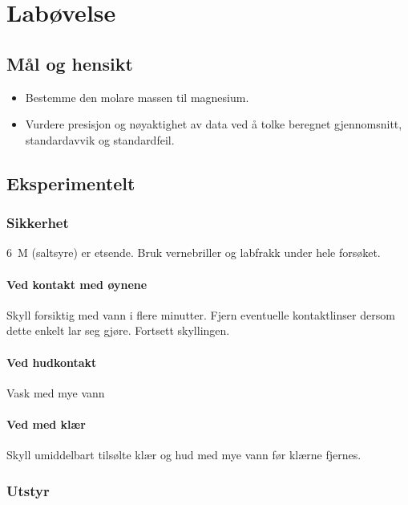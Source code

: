 	\clearpage
	
	\section{Labøvelse}
	
	\subsection{Mål og hensikt}
	\begin{itemize}
		\item Bestemme den molare massen til magnesium.
		\item Vurdere presisjon og nøyaktighet av data ved å tolke beregnet gjennomsnitt, standardavvik og standardfeil.
	\end{itemize}
	
	\subsection{Eksperimentelt}
	
	\subsubsection{Sikkerhet}
	\SI{6}{M}  (saltsyre) er etsende. Bruk vernebriller og labfrakk under hele forsøket.
	
	\paragraph{Ved kontakt med øynene}
	Skyll forsiktig med vann i flere minutter. Fjern eventuelle kontaktlinser dersom dette enkelt lar seg gjøre. Fortsett skyllingen.
	
	\paragraph{Ved hudkontakt}
	Vask med mye vann
	
	\paragraph{Ved med klær}
	Skyll umiddelbart tilsølte klær og hud med mye vann før klærne fjernes. 
	
	\subsubsection{Utstyr}
	

